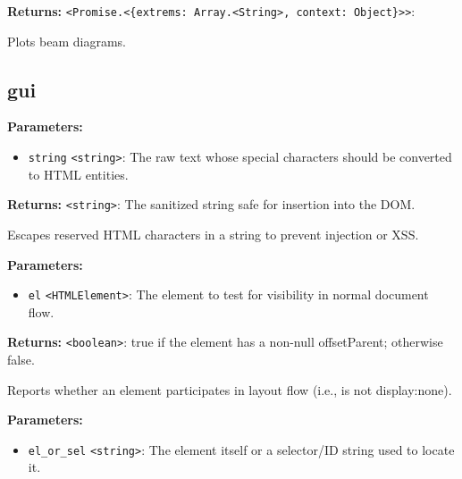 \documentclass[12pt,a4paper]{article}
\begin{document}
\noindent \textbf{Returns:} \texttt{<Promise.<\{extrems: Array.<String>, context: Object\}>>}: 

\noindent Plots beam diagrams.


\subsection{gui}
\vspace{5mm}
\noindent {}


\noindent \textbf{Parameters:}
\begin{itemize}
  \item \texttt{string} \texttt{<string>}: The raw text whose special characters should be converted to HTML entities.
\end{itemize}

\noindent \textbf{Returns:} \texttt{<string>}: The sanitized string safe for insertion into the DOM.

\noindent Escapes reserved HTML characters in a string to prevent injection or XSS.

\vspace{5mm}
\noindent {}


\noindent \textbf{Parameters:}
\begin{itemize}
  \item \texttt{el} \texttt{<HTMLElement>}: The element to test for visibility in normal document flow.
\end{itemize}

\noindent \textbf{Returns:} \texttt{<boolean>}: \textasciigrave{}true\textasciigrave{} if the element has a non-null \textasciigrave{}offsetParent\textasciigrave{}; otherwise \textasciigrave{}false\textasciigrave{}.

\noindent Reports whether an element participates in layout flow (i.e., is not \textasciigrave{}display:none\textasciigrave{}).

\vspace{5mm}
\noindent {}


\noindent \textbf{Parameters:}
\begin{itemize}
  \item \texttt{el\_or\_sel} \texttt{<string>}: The element itself or a selector/ID string used to locate it.
\end{itemize}
\end{document}
